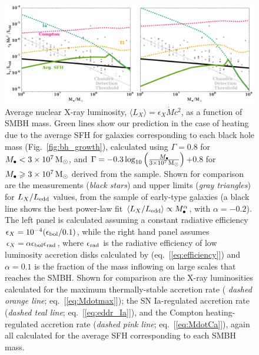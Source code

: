 \documentclass[usenatbib,fleqn]{mn2e}
\newcommand{\Mdot}{\dot{M}}
\newcommand{\Mbh}[1][]{M_{\bullet#1}}
\begin{document}
\begin{figure}
\includegraphics[width=\textwidth]{miller.pdf}
\caption{\label{fig:miller} Average nuclear X-ray luminosity, $\langle
  L_X \rangle = \epsilon_X \Mdot c^2$, as a function of SMBH mass.
  Green lines show our prediction in the case of heating due to the
  average SFH for galaxies corresponding to each black hole mass
  (Fig.~\ref{fig:bh_growth}), calculated using $\Gamma = 0.8$ for
  $\Mbh < 3 \times 10^7 \Msun$, and $\Gamma=-0.3 \log_{10}
  \left(\frac{\Mbh}{3\times 10^7 \Msun}\right)$+0.8 for $\Mbh \geq 3
  \times 10^7 \Msun$ derived from the \citet{LauerFaber+:2007a}
  sample.  Shown for comparison are the measurements ({\it black
    stars}) and upper limits ({\it gray triangles}) for $L_X/L_{\rm
    edd}$ values, from the \citet{Miller+15} sample of early-type
  galaxies (a black line shows the best power-law fit $\langle
  L_X/L_{\rm edd}\rangle \propto M_{\bullet}^{\alpha}$, with $\alpha =
  -0.2$).  The left panel is calculated assuming a constant radiative
  efficiency $\epsilon_X=10^{-4} (\epsilon_{\rm bol}/0.1)$, while the
  right hand panel assumes $\epsilon_X= \alpha \epsilon_{\rm
    bol}\epsilon_{\rm rad}$, where $\epsilon_{\rm rad}$ is the
  radiative efficiency of low luminosity accretion disks calculated by
  \citet{Sharma+2007} (eq.~[\ref{eq:efficiency}]) and $\alpha = 0.1$
  is the fraction of the mass inflowing on large scales that reaches
  the SMBH.  Shown for comparison are the X-ray luminosities
  calculated for the maximum thermally-stable accretion rate ({\it
    dashed orange line}; eq.~[\ref{eq:Mdotmax}]); the SN Ia-regulated
  accretion rate ({\it dashed teal line}; eq.~[\ref{eq:eddr_Ia}]), and
  the Compton heating-regulated accretion rate ({\it dashed pink
    line}; eq.~[\ref{eq:MdotCa}]), again all calculated for the
  average SFH corresponding to each SMBH mass.}
\end{figure}
\end{document}
